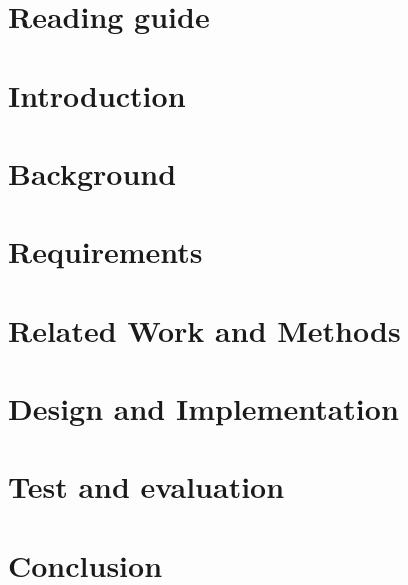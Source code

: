 \documentclass[35pt]{report}
\begin{document}
\chapter*{Reading guide}



\chapter{Introduction}


\chapter{Background}


\chapter{Requirements}


\chapter{Related Work and Methods}


\chapter{Design and Implementation}


\chapter{Test and evaluation}

\chapter{Conclusion}



\end{document}
